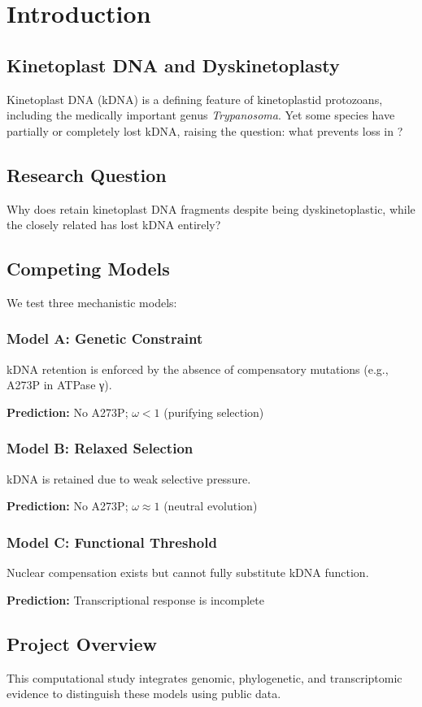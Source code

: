 \chapter{Introduction}

\section{Kinetoplast DNA and Dyskinetoplasty}

Kinetoplast DNA (kDNA) is a defining feature of kinetoplastid protozoans, including the medically important genus \textit{Trypanosoma}. Yet some species have partially or completely lost kDNA, raising the question: what prevents loss in \teq{}?

\section{Research Question}

Why does \teq{} retain kinetoplast DNA fragments despite being dyskinetoplastic, while the closely related \tev{} has lost kDNA entirely?

\section{Competing Models}

We test three mechanistic models:

\subsection{Model A: Genetic Constraint}
kDNA retention is enforced by the absence of compensatory mutations (e.g., A273P in ATPase γ).

\textbf{Prediction:} No A273P; $\omega < 1$ (purifying selection)

\subsection{Model B: Relaxed Selection}
kDNA is retained due to weak selective pressure.

\textbf{Prediction:} No A273P; $\omega \approx 1$ (neutral evolution)

\subsection{Model C: Functional Threshold}
Nuclear compensation exists but cannot fully substitute kDNA function.

\textbf{Prediction:} Transcriptional response is incomplete

\section{Project Overview}

This computational study integrates genomic, phylogenetic, and transcriptomic evidence to distinguish these models using public data.